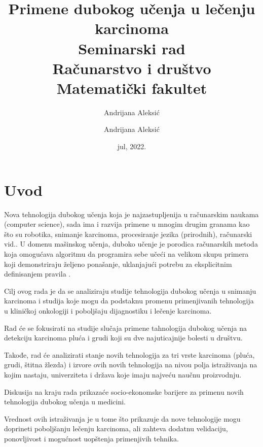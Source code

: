 \documentclass[a4paper]{article}
\author{Andrijana Aleksić}
\begin{document}
\title{Primene dubokog učenja u lečenju 
karcinoma\\ 

\bigskip
\small{Seminarski rad
\\Računarstvo i društvo
\\ Matematički fakultet}}

\author{Andrijana Aleksić}
\date{jul, 2022.}
\maketitle



\newpage

\tableofcontents

\newpage

\section{Uvod}
\label{sec:uvod}
Nova tehnologija dubokog učenja koja je najzastupljenija u računarskim naukama (computer science), sada ima i razvija primene u mnogim drugim granama kao što su robotika, snimanje karcinoma, procesiranje jezika (prirodnih), računarski vid.\cite{goodfellow}.
U domenu mašinskog učenja, duboko učenje je porodica računarskih metoda koja omogućava algoritmu da programira sebe učeći na velikom skupu primera koji demonstriraju željeno ponašanje, uklanjajući potrebu za eksplicitnim definisanjem pravila \cite{lafrate}.

Cilj ovog rada je da se analiziraju studije tehnologija dubokog učenja u snimanju karcinoma i studija koje mogu da podstaknu promenu primenjivanih tehnologija u kliničkoj onkologiji i poboljšaju dijagnostiku i lečenje karcinoma.

Rad će se fokusirati na studije slučaja primene tahnologija dubokog učenja na detekciju karcinoma pluća i grudi koji su dve najuticajnije bolesti u društvu. 

Takođe, rad će analizirati stanje novih tehnologija za tri vrste karcinoma (pluća, grudi, štitna žlezda) i izvore ovih novih tehnologija na nivou polja istraživanja na kojim nastaju, univerziteta i država koje imaju najveću naučnu proizvodnju. 

Diskusija na kraju rada prikazaće socio-ekonomske barijere za primenu novih tehnologija dubokog učenja u medicini.

Vrednost ovih istraživanja je u tome što prikazuje da nove tehnologije mogu doprineti poboljšanju lečenju karcinoma, ali zahteva dodatnu velidaciju, ponovljivost i mogućnost uopštenja primenjivih tehnika.
\end{document}
